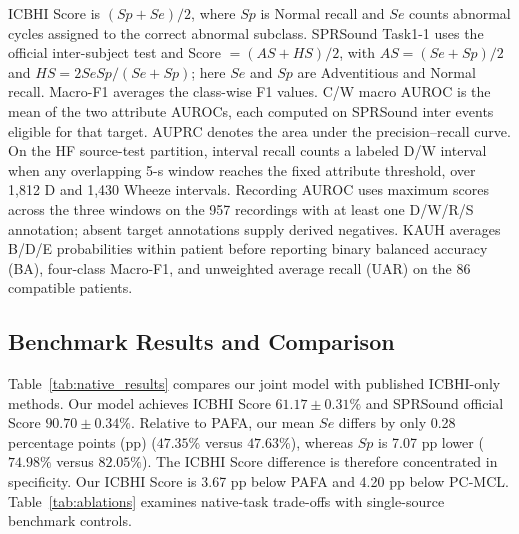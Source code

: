ICBHI Score is $(Sp+Se)/2$, where $Sp$ is Normal recall and $Se$ counts
abnormal cycles assigned to the correct abnormal subclass.
SPRSound Task1-1 uses the official inter-subject test and
Score $=(AS+HS)/2$, with $AS=(Se+Sp)/2$ and $HS=2SeSp/(Se+Sp)$;
here $Se$ and $Sp$ are Adventitious and Normal recall.
Macro-F1 averages the class-wise F1 values.
C/W macro AUROC is the mean of the two attribute AUROCs, each computed
on SPRSound inter events eligible for that target. AUPRC denotes the area
under the precision--recall curve.
On the HF source-test partition, interval recall counts a labeled D/W
interval when any overlapping 5-s window reaches the fixed attribute
threshold, over 1,812 D and 1,430 Wheeze intervals.
Recording AUROC uses maximum scores across the three windows
on the 957 recordings with at least one D/W/R/S annotation; absent target
annotations supply derived negatives. KAUH averages B/D/E probabilities
within patient before reporting binary balanced accuracy (BA), four-class
Macro-F1, and unweighted average recall (UAR) on the 86 compatible patients.

\subsection{Benchmark Results and Comparison}
\label{sec:native_results}
Table~\ref{tab:native_results} compares our joint model with published
ICBHI-only methods. Our model achieves ICBHI Score $61.17\pm0.31\%$ and
SPRSound official Score $90.70\pm0.34\%$.
Relative to PAFA, our mean $Se$ differs by only 0.28 percentage points (pp)
($47.35\%$ versus $47.63\%$), whereas $Sp$ is 7.07 pp lower
($74.98\%$ versus $82.05\%$). The ICBHI Score difference is therefore
concentrated in specificity. Our ICBHI Score is 3.67 pp below PAFA and
4.20 pp below PC-MCL. Table~\ref{tab:ablations} examines native-task
trade-offs with single-source benchmark controls.

